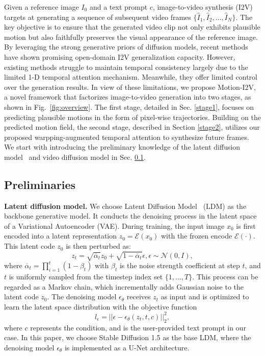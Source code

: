 \documentclass[10pt,twocolumn,letterpaper]{article}
\begin{document}
Given a reference image $I_0$ and a text prompt $c$, image-to-video synthesis (I2V) targets at generating a sequence of subsequent video frames $\{\hat{I}_1,\hat{I}_2,\dots,\hat{I}_N\}$. The key objective is to ensure that the generated video clip not only exhibits plausible motion but also faithfully preserves the visual appearance of the reference image. By leveraging the strong generative priors of diffusion models, recent methods have shown promising open-domain I2V generalization capacity. However, existing methods struggle to maintain temporal consistency largely due to the limited 1-D temporal attention mechanism. Meanwhile, they offer limited control over the generation results. In view of these limitations, we propose Motion-I2V, a novel framework that factorizes image-to-video generation into two stages, as shown in Fig.~\ref{fig:overview}. The first stage, detailed in Sec. \ref{stage1}, focuses on predicting plausible motions in the form of pixel-wise trajectories. Building on the predicted motion field, the second stage, described in Section \ref{stage2}, utilizes our proposed warpping-augmented temporal attention to synthesize future frames. We start with introducing the preliminary knowledge of the latent diffusion model~\cite{rombach2021highresolution} and video diffusion model in Sec. \ref{Preliminaries}.

\subsection{Preliminaries} \label{Preliminaries}
\noindent \textbf{Latent diffusion model.} We choose Latent Diffusion Model~\cite{rombach2021highresolution} (LDM) as the backbone generative model. It conducts the denoising process in the latent space of a Variational Autoencoder (VAE). During training, the input image $x_0$ is first encoded into a latent representation $z_0=\mathcal{E}(x_0)$ with the frozen encode $\mathcal{E}(\cdot)$. This latent code $z_0$ is then perturbed as:
\begin{equation}
    z_t = \sqrt{\overline{\alpha}_t} z_0 + \sqrt{1-\overline{\alpha}_t} \epsilon, \epsilon \sim \mathcal{N}(0,I),
\end{equation} \label{add-noise}
where $\overline{\alpha}_t = \prod_{i=1}^{t} (1-\beta_t)$ with $\beta_t$ is the noise strength coefficient at step $t$, and $t$ is uniformly sampled from the timestep index set $\{1,\dots,T\}$. This process can be regarded as a Markov chain, which incrementally adds Gaussian noise to the latent code $z_0$. The denoising model $\epsilon_\theta$ receives $z_t$ as input and is optimized to learn the latent space distribution with the objective function
\begin{equation}
    l_{\epsilon} = || \epsilon - \epsilon_{\theta}(z_t,t,c) ||_{2}^{2},
\end{equation}
where $c$ represents the condition, and is the user-provided text prompt in our case. In this paper, we choose Stable Diffusion 1.5 as the base LDM, where the denoising model $\epsilon_\theta$ is implemented as a U-Net architecture.
\end{document}
